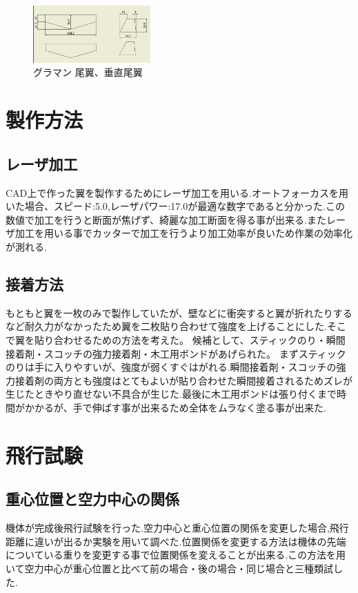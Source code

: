 \documentclass[twocolumn,11pt]{abst}
\begin{document}
\begin{figure}[htbp]
  \begin{center}
    \includegraphics[width=45mm]{guramantail.jpg}
    \end{center}
  \caption{グラマン 尾翼、垂直尾翼}
 \label{fig:guramantail}
\end{figure}

\section{製作方法}
\subsection{レーザ加工}
CAD上で作った翼を製作するためにレーザ加工を用いる.オートフォーカスを用いた場合、スピード:5.0,レーザパワー:17.0が最適な数字であると分かった.この数値で加工を行うと断面が焦げず、綺麗な加工断面を得る事が出来る.またレーザ加工を用いる事でカッターで加工を行うより加工効率が良いため作業の効率化が測れる.

\subsection{接着方法}
もともと翼を一枚のみで製作していたが、壁などに衝突すると翼が折れたりするなど耐久力がなかったため翼を二枚貼り合わせて強度を上げることにした.そこで翼を貼り合わせるための方法を考えた。
候補として、スティックのり・瞬間接着剤・スコッチの強力接着剤・木工用ボンドがあげられた。
まずスティックのりは手に入りやすいが、強度が弱くすぐはがれる.瞬間接着剤・スコッチの強力接着剤の両方とも強度はとてもよいが貼り合わせた瞬間接着されるためズレが生じたときやり直せない不具合が生じた.最後に木工用ボンドは張り付くまで時間がかかるが、手で伸ばす事が出来るため全体をムラなく塗る事が出来た.

\section{飛行試験}

\subsection{重心位置と空力中心の関係}
機体が完成後飛行試験を行った.空力中心と重心位置の関係を変更した場合,飛行距離に違いが出るか実験を用いて調べた.位置関係を変更する方法は機体の先端についている重りを変更する事で位置関係を変えることが出来る.この方法を用いて空力中心が重心位置と比べて前の場合・後の場合・同じ場合と三種類試した.
\end{document}

